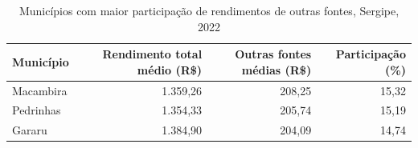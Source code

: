 \begin{table}[htbp]
\centering
\caption{Municípios com maior participação de rendimentos de outras fontes, Sergipe, 2022}
\label{tab:item5-outras-fontes}
\small
\begin{tabular}{lrrr}
\toprule
Município & Rendimento total médio (R\$) & Outras fontes médias (R\$) & Participação (\%) \\
\midrule
Macambira & 1.359,26 & 208,25 & 15,32 \\
Pedrinhas & 1.354,33 & 205,74 & 15,19 \\
Gararu & 1.384,90 & 204,09 & 14,74 \\
\bottomrule
\end{tabular}
\end{table}
